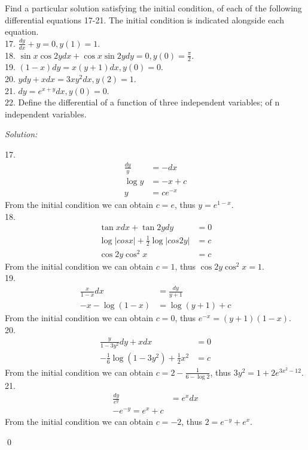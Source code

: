 \documentclass[12pt]{article}
\newenvironment{problem}[2][Problem]{\begin{trivlist}
\item[\hskip \labelsep {\bfseries #1}\hskip \labelsep {\bfseries #2.}]}{\end{trivlist}}
\newenvironment{sol}
    {\emph{Solution:}
    }
    {
    \qed
    }
\begin{document}
\begin{problem}{2}
Find a particular solution satisfying the initial condition, of each of the following differential equations 17-21. The initial condition is indicated alongside each equation. \\
17. $ \frac{dy}{dx} + y = 0, y(1) = 1$. \\
18. $ \sin x \cos 2y dx + \cos x \sin 2ydy = 0, y(0) = \frac{\pi}{2} $. \\ 
19. $ (1-x)dy = x(y+1) dx, y(0) = 0$. \\
20. $ ydy+xdx = 3xy^2dx, y(2) = 1 $. \\
21. $ dy = e^{x+y}dx, y(0) = 0 $. \\
22. Define the differential of a function of three independent variables; of n independent variables.
\end{problem}
\begin{sol}
17.
\begin{align*}
	\frac{dy}{y} &= -dx \\
	\log y &= -x + c \\
	y &= ce^{-x}
\end{align*}
From the initial condition we can obtain $ c = e $, thus $ y = e^{1-x} $.\\
18.
\begin{align*}
	\tan x dx + \tan 2y dy &= 0 \\
	\log |cos x| + \frac{1}{2}\log |cos 2y| &= c \\
	\cos 2y \cos^2x &= c
\end{align*}	
From the initial condition we can obtain $ c = 1 $, thus $ \cos 2y\cos^2 x = 1 $.\\
19.
\begin{align*}
	\frac{x}{1-x}dx &= \frac{dy}{y+1} \\
	-x-\log(1-x) &= \log (y+1) + c
\end{align*}
From the initial condition we can obtain $ c = 0 $, thus $ e^{-x} = (y+1)(1-x) $. \\
20.
\begin{align*}
	\frac{y}{1-3y^2}dy + xdx &= 0 \\
	-\frac{1}{6}\log(1-3y^2) + \frac{1}{2}x^2 &= c 
\end{align*}
From the initial condition we can obtain $ c = 2-\frac{1}{6-\log 2} $, thus $ 3y^2 = 1+2e^{3x^2-12} $. \\
21. 
\begin{align*}
	\frac{dy}{e^y} &= e^x dx \\
	-e^{-y} = e^x + c
\end{align*}
From the initial condition we can obtain $ c = -2 $, thus $ 2 = e^{-y} + e^x $.

\end{sol}
\end{document}
